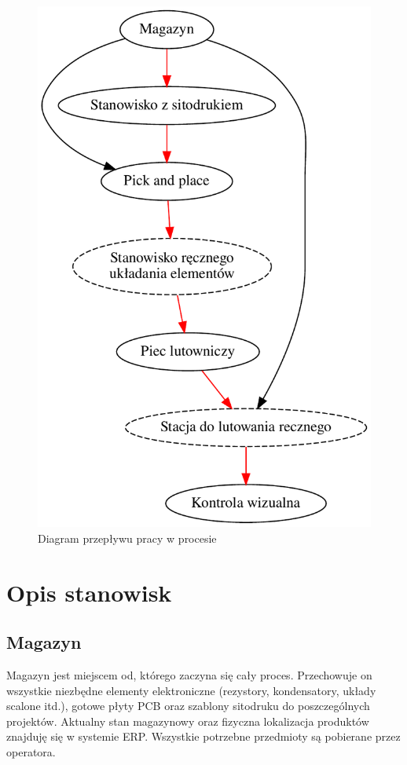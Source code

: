 \begin{figure}[H]
	\centering
	\includegraphics[scale=0.5]{./chapters/chapter2/flow_work.pdf}
	\caption{Diagram przepływu pracy w procesie}
	\label{DiagFlow}
\end{figure}

\section{Opis stanowisk}

\subsection{Magazyn}
Magazyn jest miejscem od, którego zaczyna się cały proces.
Przechowuje on wszystkie niezbędne elementy elektroniczne (rezystory, kondensatory, układy scalone itd.), gotowe płyty PCB oraz szablony sitodruku do poszczególnych projektów.
Aktualny stan magazynowy oraz fizyczna lokalizacja produktów znajduję się w systemie ERP\@.
Wszystkie potrzebne przedmioty są pobierane przez operatora.

